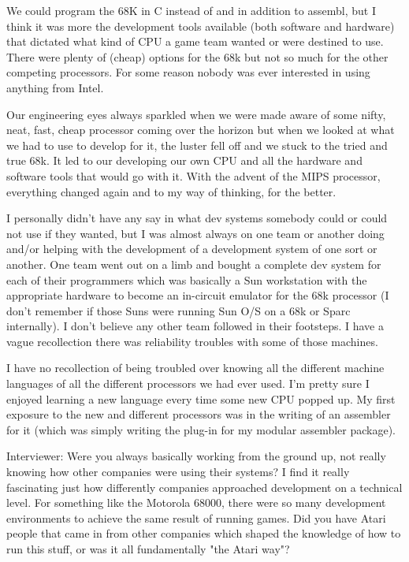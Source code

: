 We could program the 68K in C instead of and in addition to assembl, but I think it was more the development tools available (both software and hardware) that dictated what kind of CPU a game team wanted or were destined to use. There were plenty of (cheap) options for the 68k but not so much for the other competing processors. For some reason nobody was ever interested in using anything from Intel. 

Our engineering eyes always sparkled when we were made aware of some nifty, neat, fast, cheap processor coming over the horizon but when we looked at what we had to use to develop for it, the luster fell off and we stuck to the tried and true 68k. It led to our developing our own CPU and all the hardware and software tools that would go with it. With the advent of the MIPS processor, everything changed again and to my way of thinking, for the better.

I personally didn't have any say in what dev systems somebody could or could not use if they wanted, but I was almost always on one team or another doing and/or helping with the development of a development system of one sort or another. One team went out on a limb and bought a complete dev system for each of their programmers which was basically a Sun workstation with the appropriate hardware to become an in-circuit emulator for the 68k processor (I don't remember if those Suns were running Sun O/S on a 68k or Sparc internally). I don't believe any other team followed in their footsteps. I have a vague recollection there was reliability troubles with some of those machines.

I have no recollection of being troubled over knowing all the different machine languages of all the different processors we had ever used. I'm pretty sure I enjoyed learning a new language every time some new CPU popped up. My first exposure to the new and different processors was in the writing of an assembler for it (which was simply writing the plug-in for my modular assembler package).

\textcolor{interviewer}{Interviewer:} Were you always basically working from the ground up, not really knowing how other companies were using their systems? I find it really fascinating just how differently companies approached development on a technical level. For something like the Motorola 68000, there were so many development environments to achieve the same result of running games. Did you have Atari people that came in from other companies which shaped the knowledge of how to run this stuff, or was it all fundamentally "the Atari way"?

